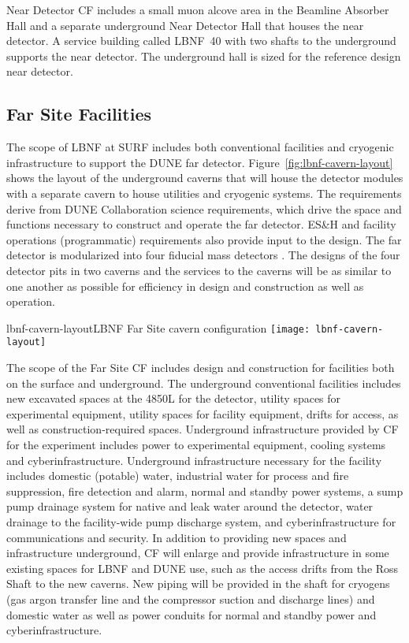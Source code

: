 Near Detector CF includes a small muon alcove area in the Beamline Absorber Hall and a separate underground Near Detector Hall that houses the near detector. A service building called LBNF~40 with two shafts to the underground supports the near detector. The underground hall is sized for the reference design near detector.
 
\subsection{Far Site Facilities}
 
The scope of LBNF at SURF includes both conventional facilities and cryogenic infrastructure to support the DUNE far detector. Figure~\ref{fig:lbnf-cavern-layout} shows the layout of the underground caverns that will house the detector modules with a separate cavern to house utilities and cryogenic systems. The requirements derive from DUNE Collaboration science requirements, which drive the space and functions necessary to construct and operate the far detector.  ES\&H and facility operations (programmatic) requirements also provide input to the design. The far detector is modularized into four  fiducial mass detectors . The designs of the four detector pits in two caverns and the services to the caverns will be as similar to one another as possible for efficiency in design and construction as well as operation. 
 
\begin{cdrfigure}{lbnf-cavern-layout}{LBNF Far Site cavern configuration}  
\texttt{[image: lbnf-cavern-layout]}
\end{cdrfigure}
 
 
The scope of the Far Site CF includes design and construction for facilities both on the surface and underground. The underground conventional facilities includes new excavated spaces at the 4850L for the detector, utility spaces for experimental equipment, utility spaces for facility equipment, drifts for access, as well as construction-required spaces. Underground infrastructure provided by CF for the experiment includes power to experimental equipment, cooling systems and cyberinfrastructure. Underground infrastructure necessary for the facility includes domestic (potable) water, industrial water for process and fire suppression, fire detection and alarm, normal and standby power systems, a sump pump drainage system for native and leak water around the detector, water drainage to the facility-wide pump discharge system, and cyberinfrastructure for communications and security.
In addition to providing new spaces and infrastructure underground, CF will enlarge and provide infrastructure in some existing spaces for LBNF and DUNE use, such as the access drifts from the Ross Shaft to the new caverns. New piping will be provided in the shaft for cryogens (gas argon transfer line and the compressor suction and discharge lines) and domestic water as well as power conduits for normal and standby power and cyberinfrastructure. 
 
